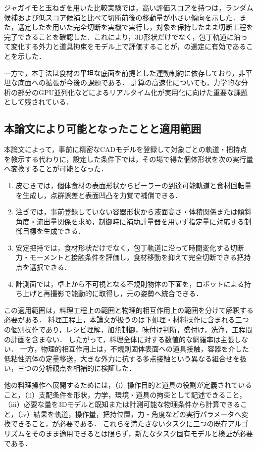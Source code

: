ジャガイモと玉ねぎを用いた比較実験では，高い評価スコアを持つ{\nameholdingpointset}は，ランダム候補および低スコア候補と比べて切断前後の移動量が小さい傾向を示した．また，選定した{\nameholdingpointset}を用いた完全切断を実機で実行し，対象を保持したまま切断工程を完了できることを確認した．これにより，3D形状だけでなく，包丁軌道に沿って変化する外力と道具拘束をモデル上で評価することが，{\nameholdingpointset}の選定に有効であることを示した．

一方で，本手法は食材の平坦な底面を前提とした運動制約に依存しており，非平坦な底面への拡張が今後の課題である．
計算の高速化についても，力学的な分析の部分のGPU並列化などによるリアルタイム化が実用化に向けた重要な課題として残されている．

\begin{revisionblock}
\section{本論文により可能となったことと適用範囲}
\label{sec:conclusion_scope}

本論文によって，事前に精密なCADモデルを登録して対象ごとの軌道・把持点を教示する代わりに，設定した条件下では，その場で得た個体形状を次の実行量へ変換することが可能となった．

\begin{enumerate}
  \item 皮むきでは，個体食材の表面形状からピーラーの到達可能軌道と食材回転量を生成し，点群誤差と表面凹凸を力覚で補償できる．
  \item 注ぎでは，事前登録していない容器形状から液面高さ・体積関係または傾斜角度・流出量関係を求め，制御時に補助計量器を用いず指定量に対応する制御目標を生成できる．
  \item 安定把持では，食材形状だけでなく，包丁軌道に沿って時間変化する切断力・モーメントと接触条件を評価し，食材移動を抑えて完全切断できる把持点を選択できる．
  \item 計測面では，卓上から不可視となる不規則物体の下面を，ロボットによる持ち上げと再撮影で能動的に取得し，元の姿勢へ統合できる．
\end{enumerate}

この適用範囲は，料理工程上の範囲と物理的相互作用上の範囲を分けて解釈する必要がある．
料理工程上，本論文が扱うのは下処理・材料操作に含まれる三つの個別操作であり，レシピ理解，加熱制御，味付け判断，盛付け，洗浄，工程間の計画を含まない．
したがって，料理全体に対する数値的な網羅率は主張しない．
一方，物理的相互作用上は，不規則固体表面への道具接触，容器を介した低粘性流体の定量移送，大きな外力に抗する多点接触という異なる組合せを扱い，三つの分析観点を相補的に検証した．

他の料理操作へ展開するためには，（i）操作目的と道具の役割が定義されていること，（ii）支配条件を形状，力学，環境・道具の拘束として記述できること，（iii）必要な量を3Dモデルと既知または計測可能な物理条件から計算できること，（iv）結果を軌道，操作量，把持位置，力・角度などの実行パラメータへ変換できること，が必要である．
これらを満たさないタスクに三つの既存アルゴリズムをそのまま適用できるとは限らず，新たなタスク固有モデルと検証が必要である．
\end{revisionblock}


